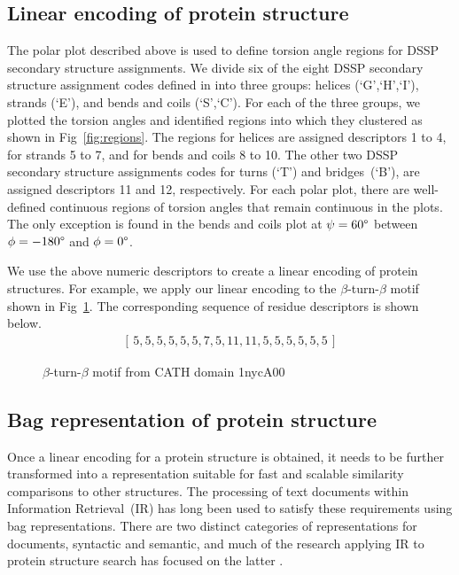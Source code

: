 \documentclass[10pt,letterpaper]{article}
\renewcommand{\figurename}{Fig}
\begin{document}
\subsection*{Linear encoding of protein structure}

The polar plot described above is used to define torsion angle regions for DSSP secondary structure assignments.
We divide six of the eight DSSP secondary structure assignment codes defined in \cite{Kabsch1983} into three groups: helices (`G',`H',`I'), strands (`E'), and bends and coils (`S',`C').
For each of the three groups, we plotted the torsion angles and identified regions into which they clustered as shown in \figurename~\ref{fig:regions}.
The regions for helices are assigned descriptors 1 to 4, for strands 5 to 7, and for bends and coils 8 to 10. 
The other two DSSP secondary structure assignments codes for turns (`T') and bridges~(`B'), are assigned descriptors 11 and 12, respectively.
For each polar plot, there are well-defined continuous regions of torsion angles that remain continuous in the plots. 
The only exception is found in the bends and coils plot at $\psi = 60\degree$ between $\phi = -180\degree$ and $\phi = 0\degree$.

\begin{figure*}[!h]
\caption{Polar plots of randomly sampled torsion angles with designated descriptors for region and DSSP code combinations}
\label{fig:regions}
\end{figure*}

We use the above numeric descriptors to create a linear encoding of protein structures. 
For example, we apply our linear encoding to the $\beta$-turn-$\beta$ motif shown in \figurename~\ref{fig:beta_turn}.
The corresponding sequence of residue descriptors is shown below.
\begin{gather}\label{E:descrseq} 
    [\, 5, 5, 5, 5, 5, 5, 7, 5, 11, 11, 5, 5, 5, 5, 5, 5 \,]
\end{gather}

\begin{figure}[!h]
\caption{$\beta$-turn-$\beta$ motif from CATH domain 1nycA00}
\label{fig:beta_turn}
\end{figure}

\subsection*{Bag representation of protein structure}

Once a linear encoding for a protein structure is obtained, it needs to be further transformed into a representation suitable for fast and scalable similarity comparisons to other structures.
The processing of text documents within Information Retrieval~(IR) has long been used to satisfy these requirements using bag representations.
There are two distinct categories of representations for documents, syntactic and semantic, and much of the research applying IR to protein structure search has focused on the latter \cite{Aungand2004,Zhang2010,Budowski2010}. 
\end{document}
